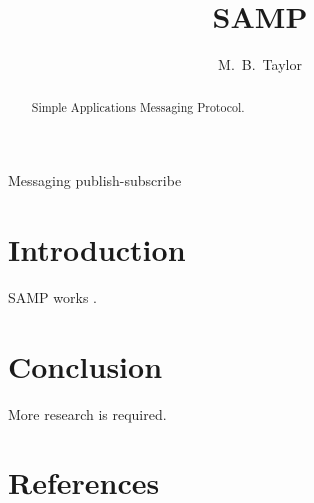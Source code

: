 \documentclass[5p]{elsarticle}
\begin{document}
\begin{frontmatter}

\title{SAMP}

\author{M.~B.~Taylor}
\address{H~H~Wills Physics Laboratory, University of Bristol, UK}

\begin{abstract}
Simple Applications Messaging Protocol.
\end{abstract}

\begin{keyword}
Messaging publish-subscribe
\end{keyword}

\end{frontmatter}

\section{Introduction}

SAMP works \citep{adassxxii_bof}.

\section{Conclusion}

More research is required.

\section*{References}


\end{document}

